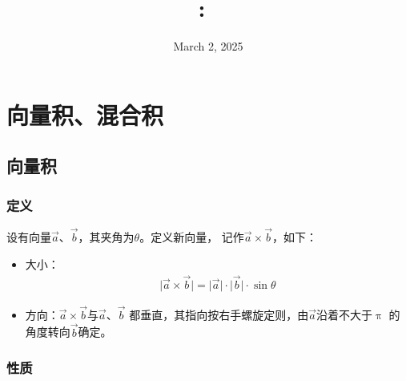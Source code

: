 \documentclass[12pt, a4paper]{article}
\title{
    \vspace{2in}
    \textmd{\textbf{\hmwkClass:\ \hmwkTitle}}\\
    \vspace{0.4in}
    \large{\textit{\myUniversiy}}
    \vspace{3in}
}
\author{\hmwkAuthorName}
\date{March 2, 2025}
\numberwithin{equation}{section}
\begin{document}
\maketitle

\pagebreak


\tableofcontents

\newpage 
\mbox{}
\newpage

\pagebreak


\pagebreak

\section{向量积、混合积}

\subsection{向量积}

\subsubsection{定义}

    设有向量\(\overrightarrow{a}\)、\(\overrightarrow{b}\)，其夹角为\(\theta\)。定义新向量，
    记作\(\overrightarrow{a} \times \overrightarrow{b}\)，如下：

    \begin{itemize}
        \item 大小：
            \begin{align}
                \lvert \overrightarrow{a} \times \overrightarrow{b} \rvert =
                \lvert \overrightarrow{a} \rvert \cdot \lvert \overrightarrow{b} \rvert \cdot \sin\theta
            \end{align}            
        \item 方向：\(\overrightarrow{a} \times \overrightarrow{b}\)与\(\overrightarrow{a}\)、\(\overrightarrow{b}\)
            都垂直，其指向按右手螺旋定则，由\(\overrightarrow{a}\)沿着不大于\(\uppi\)
            的角度转向\(\overrightarrow{b}\)确定。
    \end{itemize}

\subsubsection{性质}
\end{document}
